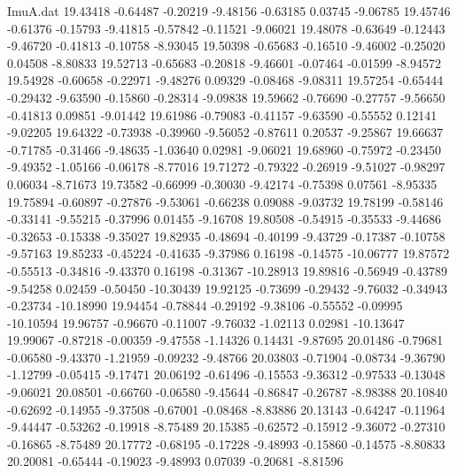 \begin{filecontents}{ImuA.dat}
  19.43418   -0.64487   -0.20219   -9.48156   -0.63185    0.03745   -9.06785
  19.45746   -0.61376   -0.15793   -9.41815   -0.57842   -0.11521   -9.06021
  19.48078   -0.63649   -0.12443   -9.46720   -0.41813   -0.10758   -8.93045
  19.50398   -0.65683   -0.16510   -9.46002   -0.25020    0.04508   -8.80833
  19.52713   -0.65683   -0.20818   -9.46601   -0.07464   -0.01599   -8.94572
  19.54928   -0.60658   -0.22971   -9.48276    0.09329   -0.08468   -9.08311
  19.57254   -0.65444   -0.29432   -9.63590   -0.15860   -0.28314   -9.09838
  19.59662   -0.76690   -0.27757   -9.56650   -0.41813    0.09851   -9.01442
  19.61986   -0.79083   -0.41157   -9.63590   -0.55552    0.12141   -9.02205
  19.64322   -0.73938   -0.39960   -9.56052   -0.87611    0.20537   -9.25867
  19.66637   -0.71785   -0.31466   -9.48635   -1.03640    0.02981   -9.06021
  19.68960   -0.75972   -0.23450   -9.49352   -1.05166   -0.06178   -8.77016
  19.71272   -0.79322   -0.26919   -9.51027   -0.98297    0.06034   -8.71673
  19.73582   -0.66999   -0.30030   -9.42174   -0.75398    0.07561   -8.95335
  19.75894   -0.60897   -0.27876   -9.53061   -0.66238    0.09088   -9.03732
  19.78199   -0.58146   -0.33141   -9.55215   -0.37996    0.01455   -9.16708
  19.80508   -0.54915   -0.35533   -9.44686   -0.32653   -0.15338   -9.35027
  19.82935   -0.48694   -0.40199   -9.43729   -0.17387   -0.10758   -9.57163
  19.85233   -0.45224   -0.41635   -9.37986    0.16198   -0.14575  -10.06777
  19.87572   -0.55513   -0.34816   -9.43370    0.16198   -0.31367  -10.28913
  19.89816   -0.56949   -0.43789   -9.54258    0.02459   -0.50450  -10.30439
  19.92125   -0.73699   -0.29432   -9.76032   -0.34943   -0.23734  -10.18990
  19.94454   -0.78844   -0.29192   -9.38106   -0.55552   -0.09995  -10.10594
  19.96757   -0.96670   -0.11007   -9.76032   -1.02113    0.02981  -10.13647
  19.99067   -0.87218   -0.00359   -9.47558   -1.14326    0.14431   -9.87695
  20.01486   -0.79681   -0.06580   -9.43370   -1.21959   -0.09232   -9.48766
  20.03803   -0.71904   -0.08734   -9.36790   -1.12799   -0.05415   -9.17471
  20.06192   -0.61496   -0.15553   -9.36312   -0.97533   -0.13048   -9.06021
  20.08501   -0.66760   -0.06580   -9.45644   -0.86847   -0.26787   -8.98388
  20.10840   -0.62692   -0.14955   -9.37508   -0.67001   -0.08468   -8.83886
  20.13143   -0.64247   -0.11964   -9.44447   -0.53262   -0.19918   -8.75489
  20.15385   -0.62572   -0.15912   -9.36072   -0.27310   -0.16865   -8.75489
  20.17772   -0.68195   -0.17228   -9.48993   -0.15860   -0.14575   -8.80833
  20.20081   -0.65444   -0.19023   -9.48993    0.07039   -0.20681   -8.81596

\end{filecontents}
